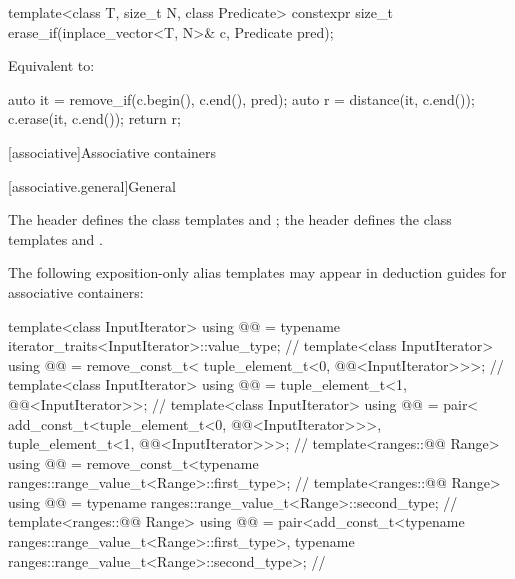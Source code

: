 %
\begin{itemdecl}
template<class T, size_t N, class Predicate>
  constexpr size_t erase_if(inplace_vector<T, N>& c, Predicate pred);
\end{itemdecl}

\begin{itemdescr}
\pnum
\effects
Equivalent to:
\begin{codeblock}
auto it = remove_if(c.begin(), c.end(), pred);
auto r = distance(it, c.end());
c.erase(it, c.end());
return r;
\end{codeblock}
\end{itemdescr}

[associative]{Associative containers}

[associative.general]{General}

\pnum
The header  defines the class templates
 and ;
the header  defines the class templates
 and .

\pnum
The following exposition-only alias templates may appear in deduction guides for associative containers:
\begin{codeblock}
template<class InputIterator>
  using @@ =
    typename iterator_traits<InputIterator>::value_type;                // \expos
template<class InputIterator>
  using @@ = remove_const_t<
    tuple_element_t<0, @@<InputIterator>>>;                // \expos
template<class InputIterator>
  using @@ =
    tuple_element_t<1, @@<InputIterator>>;                 // \expos
template<class InputIterator>
  using @@ = pair<
    add_const_t<tuple_element_t<0, @@<InputIterator>>>,
    tuple_element_t<1, @@<InputIterator>>>;                // \expos
template<ranges::@@ Range>
  using @@ =
    remove_const_t<typename ranges::range_value_t<Range>::first_type>;  // \expos
template<ranges::@@ Range>
  using @@ = typename ranges::range_value_t<Range>::second_type; // \expos
template<ranges::@@ Range>
  using @@ =
    pair<add_const_t<typename ranges::range_value_t<Range>::first_type>,
         typename ranges::range_value_t<Range>::second_type>;           // \expos
\end{codeblock}

